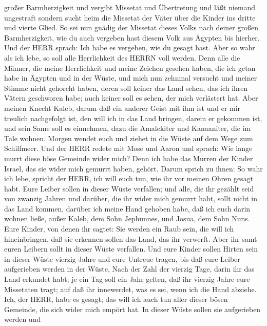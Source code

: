 großer Barmherzigkeit und vergibt Missetat und Übertretung und läßt
niemand ungestraft sondern sucht heim die Missetat der Väter über die
Kinder ins dritte und vierte Glied.  So sei nun gnädig der
Missetat dieses Volks nach deiner großen Barmherzigkeit, wie du auch
vergeben hast diesem Volk aus Ägypten bis hierher.  Und der
HERR sprach: Ich habe es vergeben, wie du gesagt hast. 
Aber so wahr als ich lebe, so soll alle Herrlichkeit des HERRN voll
werden.  Denn alle die Männer, die meine Herrlichkeit und
meine Zeichen gesehen haben, die ich getan habe in Ägypten und in der
Wüste, und mich nun zehnmal versucht und meiner Stimme nicht gehorcht
haben,  deren soll keiner das Land sehen, das ich ihren
Vätern geschworen habe; auch keiner soll es sehen, der mich verlästert
hat.  Aber meinen Knecht Kaleb, darum daß ein anderer Geist
mit ihm ist und er mir treulich nachgefolgt ist, den will ich in das
Land bringen, darein er gekommen ist, und sein Same soll es einnehmen,
 dazu die Amalekiter und Kanaaniter, die im Tale wohnen.
Morgen wendet euch und ziehet in die Wüste auf dem Wege zum Schilfmeer.
 Und der HERR redete mit Mose und Aaron und sprach:
 Wie lange murrt diese böse Gemeinde wider mich? Denn ich
habe das Murren der Kinder Israel, das sie wider mich gemurrt haben,
gehört.  Darum sprich zu ihnen: So wahr ich lebe, spricht
der HERR, ich will euch tun, wie ihr vor meinen Ohren gesagt habt.
 Eure Leiber sollen in dieser Wüste verfallen; und alle,
die ihr gezählt seid von zwanzig Jahren und darüber, die ihr wider mich
gemurrt habt,  sollt nicht in das Land kommen, darüber ich
meine Hand gehoben habe, daß ich euch darin wohnen ließe, außer Kaleb,
dem Sohn Jephunnes, und Josua, dem Sohn Nuns.  Eure Kinder,
von denen ihr sagtet: Sie werden ein Raub sein, die will ich
hineinbringen, daß sie erkennen sollen das Land, das ihr verwerft.
 Aber ihr samt euren Leibern sollt in dieser Wüste
verfallen.  Und eure Kinder sollen Hirten sein in dieser
Wüste vierzig Jahre und eure Untreue tragen, bis daß eure Leiber
aufgerieben werden in der Wüste,  Nach der Zahl der vierzig
Tage, darin ihr das Land erkundet habt; je ein Tag soll ein Jahr gelten,
daß ihr vierzig Jahre eure Missetaten tragt; auf daß ihr innewerdet, was
es sei, wenn ich die Hand abziehe.  Ich, der HERR, habe es
gesagt; das will ich auch tun aller dieser bösen Gemeinde, die sich
wider mich empört hat. In dieser Wüste sollen sie aufgerieben werden und
